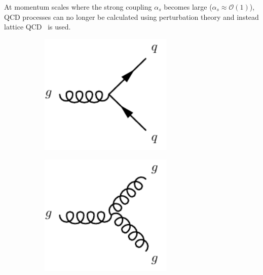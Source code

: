 At momentum scales where the strong coupling $\alpha_s$ becomes large ($\alpha_s \approx \mathcal{O}(1)$), QCD processes can no longer be calculated using perturbation theory and instead lattice QCD~\cite{PhysRevD.10.2445,DeGrand:1055545} is used. 


\begin{figure}
	\centering
	\begin{subfigure}[b]{0.33\linewidth}
		\centering\includegraphics[width=0.7\textwidth]{gluon_quark_vertex}
		\caption{\label{fig:gluon_quark_vertex}}
	\end{subfigure}%
	\begin{subfigure}[b]{0.33\linewidth}
		\centering\includegraphics[width=0.7\textwidth]{gluon_vertex}
		\caption{\label{fig:gluon_vertex}}
	\end{subfigure}	
	\begin{subfigure}[b]{0.33\linewidth}

\end{subfigure}
\end{figure}
